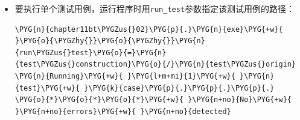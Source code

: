 \begin{itemize}

\begin{codeblockbg}
\begin{Verbatim}[commandchars=\\\{\},breaklines=true,breakanywhere=true,fontsize=\codefont,xleftmargin=17bp]
\PYG{n}{chapter11bt\PYGZus{}02}\PYG{p}{.}\PYG{n}{exe}\PYG{+w}{ }\PYG{o}{\PYGZhy{}}\PYG{o}{\PYGZhy{}}\PYG{n}{run\PYGZus{}test}\PYG{o}{=}\PYG{n}{test\PYGZus{}construction}
\PYG{n}{Running}\PYG{+w}{ }\PYG{l+m+mi}{2}\PYG{+w}{ }\PYG{n}{test}\PYG{+w}{ }\PYG{n}{cases}\PYG{p}{.}\PYG{p}{.}\PYG{p}{.}
\PYG{n+nl}{f}\PYG{p}{:}\PYG{o}{/}\PYG{n}{chapter11bt\PYGZus{}02}\PYG{o}{/}\PYG{n}{main}\PYG{p}{.}\PYG{n}{cpp}\PYG{p}{(}\PYG{l+m+mi}{12}\PYG{p}{)}\PYG{o}{:}\PYG{+w}{ }\PYG{n}{error}\PYG{o}{:}\PYG{+w}{ }\PYG{n}{in}\PYG{+w}{ }\PYG{l+s}{\PYGZdq{}}\PYG{l+s}{test\PYGZus{}construction/test\PYGZus{}}
\PYG{n}{constructor}\PYG{l+s}{\PYGZdq{}}\PYG{l+s}{: check p.z() == 4 has failed [3 != 4]}
\PYG{o}{*}\PYG{o}{*}\PYG{o}{*}\PYG{+w}{ }\PYG{l+m+mi}{1}\PYG{+w}{ }\PYG{n}{failure}\PYG{+w}{ }\PYG{n}{is}\PYG{+w}{ }\PYG{n}{detected}\PYG{+w}{ }\PYG{n}{in}\PYG{+w}{ }\PYG{n}{the}\PYG{+w}{ }\PYG{n}{test}\PYG{+w}{ }\PYG{k}{module}\PYG{+w}{ }\PYG{l+s}{\PYGZdq{}}\PYG{l+s}{Testing point 3d}\PYG{l+s}{\PYGZdq{}}
\end{Verbatim}
\end{codeblockbg}



\item 要执行单个测试用例，运行程序时用\texttt{run\_\allowbreak{}test}参数指定该测试用例的路径：



\begin{codeblockbg}
\begin{Verbatim}[commandchars=\\\{\},breaklines=true,breakanywhere=true,fontsize=\codefont,xleftmargin=17bp]
\PYG{n}{chapter11bt\PYGZus{}02}\PYG{p}{.}\PYG{n}{exe}\PYG{+w}{ }\PYG{o}{\PYGZhy{}}\PYG{o}{\PYGZhy{}}\PYG{n}{run\PYGZus{}test}\PYG{o}{=}\PYG{n}{test\PYGZus{}construction}\PYG{o}{/}\PYG{n}{test\PYGZus{}origin}
\PYG{n}{Running}\PYG{+w}{ }\PYG{l+m+mi}{1}\PYG{+w}{ }\PYG{n}{test}\PYG{+w}{ }\PYG{k}{case}\PYG{p}{.}\PYG{p}{.}\PYG{p}{.}
\PYG{o}{*}\PYG{o}{*}\PYG{o}{*}\PYG{+w}{ }\PYG{n+no}{No}\PYG{+w}{ }\PYG{n+no}{errors}\PYG{+w}{ }\PYG{n+no}{detected}
\end{Verbatim}
\end{codeblockbg}




\end{itemize}
